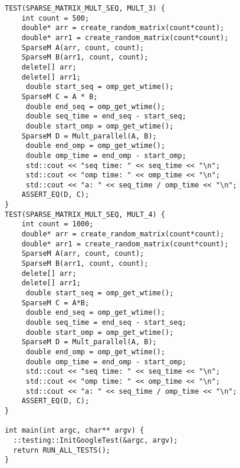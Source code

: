 \documentclass{report}
\begin{document}
\begin{lstlisting}
TEST(SPARSE_MATRIX_MULT_SEQ, MULT_3) {
    int count = 500;
    double* arr = create_random_matrix(count*count);
    double* arr1 = create_random_matrix(count*count);
    SparseM A(arr, count, count);
    SparseM B(arr1, count, count);
    delete[] arr;
    delete[] arr1;
     double start_seq = omp_get_wtime();
    SparseM C = A * B;
     double end_seq = omp_get_wtime();
     double seq_time = end_seq - start_seq;
     double start_omp = omp_get_wtime();
    SparseM D = Mult_parallel(A, B);
     double end_omp = omp_get_wtime();
     double omp_time = end_omp - start_omp;
     std::cout << "seq time: " << seq_time << "\n";
     std::cout << "omp time: " << omp_time << "\n";
     std::cout << "a: " << seq_time / omp_time << "\n";
    ASSERT_EQ(D, C);
}
TEST(SPARSE_MATRIX_MULT_SEQ, MULT_4) {
    int count = 1000;
    double* arr = create_random_matrix(count*count);
    double* arr1 = create_random_matrix(count*count);
    SparseM A(arr, count, count);
    SparseM B(arr1, count, count);
    delete[] arr;
    delete[] arr1;
     double start_seq = omp_get_wtime();
    SparseM C = A*B;
     double end_seq = omp_get_wtime();
     double seq_time = end_seq - start_seq;
     double start_omp = omp_get_wtime();
    SparseM D = Mult_parallel(A, B);
     double end_omp = omp_get_wtime();
     double omp_time = end_omp - start_omp;
     std::cout << "seq time: " << seq_time << "\n";
     std::cout << "omp time: " << omp_time << "\n";
     std::cout << "a: " << seq_time / omp_time << "\n";
    ASSERT_EQ(D, C);
}

int main(int argc, char** argv) {
  ::testing::InitGoogleTest(&argc, argv);
  return RUN_ALL_TESTS();
}

\end{lstlisting}
\end{document}
